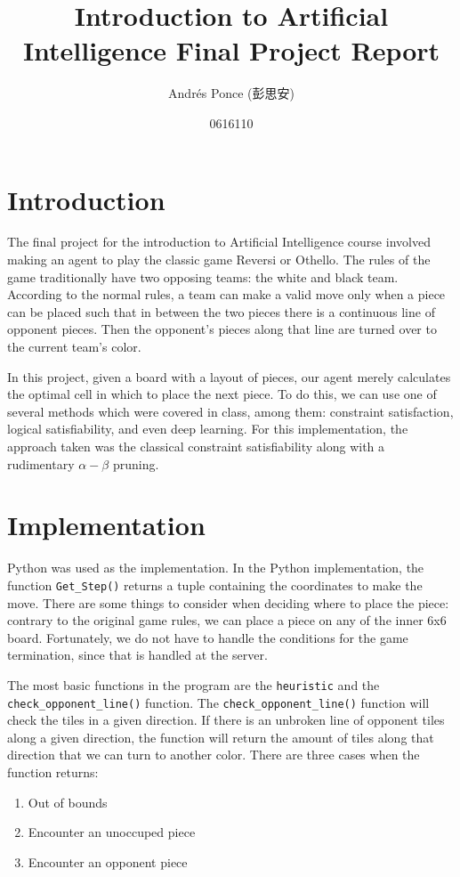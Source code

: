 \documentclass{article}
\author{Andr\'es Ponce (彭思安)\\
\and
0616110
}
\title{Introduction to Artificial Intelligence Final Project Report}
\begin{document}
\maketitle

\section{Introduction}
The final project for the introduction to Artificial Intelligence course involved
	making an agent to play the classic game Reversi or Othello.
The rules of the game traditionally have two opposing teams: the white and black team.
According to the normal rules, a team can make a valid move only when a piece can be placed
	such that in between the two pieces there is a continuous line of opponent pieces. 
Then the opponent's pieces along that line are turned over to the current team's color.

In this project, given a board with a layout of pieces, our agent merely calculates the 
	optimal cell in which to place the next piece. 
To do this, we can use one of several methods which were covered in class, among them:
	constraint satisfaction, logical satisfiability, and even deep learning. 
For this implementation, the approach taken was the classical constraint satisfiability 
	along with a rudimentary $\alpha-\beta$ pruning.

\section{Implementation}
Python was used as the implementation. 
In the Python implementation, the function \texttt{Get\_Step()} returns a tuple containing the 
	coordinates to make the move. 
There are some things to consider when deciding where to place the piece: contrary to the original 
	game rules, we can place a piece on any of the inner 6x6 board.
Fortunately, we do not have to handle  the conditions for the game termination, since that is handled 
	at the server. 

The most basic functions in the program are the \texttt{heuristic} and the \texttt{check\_opponent\_line()}
	 function.
The \texttt{check\_opponent\_line()} function will check the tiles in a given direction. 
If there is an unbroken line of opponent tiles along a given direction, the function will return 
	the amount of tiles along that direction that we can turn to another color.
There are three cases when the function returns:
	\begin{enumerate} 
		\item Out of bounds
		\item Encounter an unoccuped piece
		\item Encounter an opponent piece
	\end{enumerate}
\end{document}
